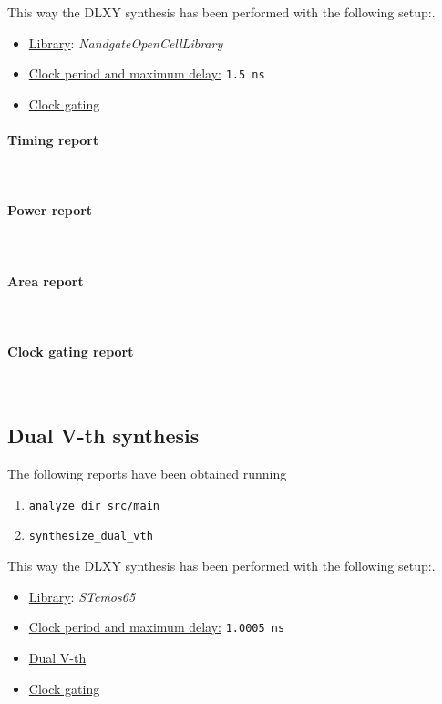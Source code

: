 \bigskip
This way the DLXY synthesis has been performed with the following setup:.
\begin{itemize}
	\item \underline{Library}: \textit{NandgateOpenCellLibrary}
	\item \underline{Clock period and maximum delay:} \texttt{1.5 ns}
	\item \underline{Clock gating}
\end{itemize}

\paragraph{Timing report} \mbox{} \\

\paragraph{Power report} \mbox{} \\

\paragraph{Area report} \mbox{} \\

\paragraph{Clock gating report} \mbox{} \\


\subsection{Dual V-th synthesis}
The following reports have been obtained running
\begin{enumerate}
	\item \texttt{analyze\_dir src/main}
	\item \texttt{synthesize\_dual\_vth}
\end{enumerate}

\bigskip
This way the DLXY synthesis has been performed with the following setup:.
\begin{itemize}
	\item \underline{Library}: \textit{STcmos65}
	\item \underline{Clock period and maximum delay:} \texttt{1.0005 ns}
	\item \underline{Dual V-th}
	\item \underline{Clock gating}
\end{itemize}

